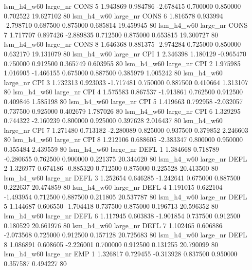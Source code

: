   lsm_h4_w60   large_nr     CONS                 5  1.943869  0.984786  -2.678415 0.700000 0.850000  0.702522   19.627102 80
  lsm_h4_w60   large_nr     CONS                 6  1.816578  0.933994  -2.798710 0.687500 0.875000  0.685814   19.459945 80
  lsm_h4_w60   large_nr     CONS                 7  1.717707  0.897426  -2.889835 0.712500 0.875000  0.653815   19.300727 80
  lsm_h4_w60   large_nr     CONS                 8  1.646368  0.881375  -2.974284 0.725000 0.850000  0.632170   19.131079 80
  lsm_h4_w60   large_nr      CPI                 1  2.346398  1.180129  -0.965470 0.750000 0.912500  0.365749    0.603955 80
  lsm_h4_w60   large_nr      CPI                 2  1.975985  1.016905  -1.466155 0.675000 0.887500  0.385979    1.005242 80
  lsm_h4_w60   large_nr      CPI                 3  1.732313  0.923033  -1.717481 0.750000 0.887500  0.410664    1.313107 80
  lsm_h4_w60   large_nr      CPI                 4  1.575583  0.867537  -1.913861 0.762500 0.912500  0.409846    1.585198 80
  lsm_h4_w60   large_nr      CPI                 5  1.419663  0.792958  -2.032057 0.737500 0.925000  0.402679    1.787026 80
  lsm_h4_w60   large_nr      CPI                 6  1.329295  0.744322  -2.160239 0.800000 0.925000  0.397628    2.016437 80
  lsm_h4_w60   large_nr      CPI                 7  1.271480  0.713182  -2.280089 0.825000 0.937500  0.379852    2.246603 80
  lsm_h4_w60   large_nr      CPI                 8  1.212106  0.688605  -2.383347 0.800000 0.950000  0.355484    2.439559 80
  lsm_h4_w60   large_nr     DEFL                 1  1.384668  0.718789  -0.280655 0.762500 0.900000  0.221375   20.344620 80
  lsm_h4_w60   large_nr     DEFL                 2  1.326977  0.674186  -0.885320 0.712500 0.875000  0.225528   20.413500 80
  lsm_h4_w60   large_nr     DEFL                 3  1.252654  0.646285  -1.242641 0.675000 0.887500  0.222637   20.474859 80
  lsm_h4_w60   large_nr     DEFL                 4  1.191015  0.622104  -1.493954 0.712500 0.887500  0.211805   20.537787 80
  lsm_h4_w60   large_nr     DEFL                 5  1.144687  0.606550  -1.704418 0.737500 0.875000  0.196713   20.596352 80
  lsm_h4_w60   large_nr     DEFL                 6  1.117945  0.603838  -1.901854 0.737500 0.912500  0.180529   20.661976 80
  lsm_h4_w60   large_nr     DEFL                 7  1.102465  0.606886  -2.073568 0.725000 0.912500  0.157128   20.725683 80
  lsm_h4_w60   large_nr     DEFL                 8  1.086891  0.608605  -2.226001 0.700000 0.912500  0.131255   20.790099 80
  lsm_h4_w60   large_nr      EMP                 1  1.326817  0.729455  -0.313928 0.837500 0.950000  0.357587    0.494227 80
